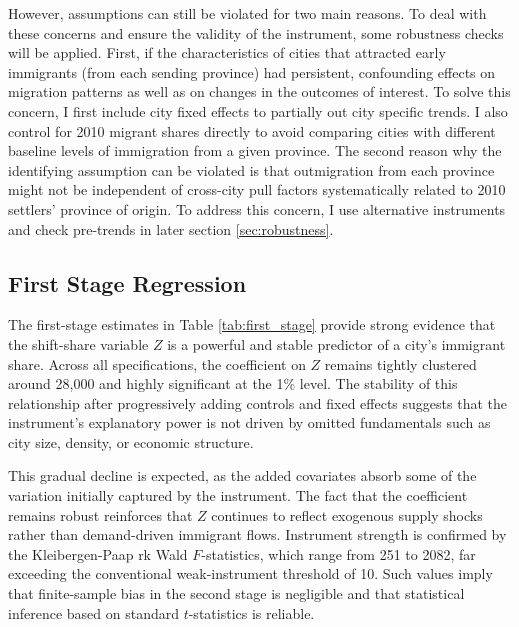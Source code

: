 \documentclass[12pt]{article}
\begin{document}
However, assumptions can still be violated for two main reasons. To deal with these concerns and ensure the validity of the instrument, some robustness checks will be applied.
First, if the characteristics of cities that attracted early immigrants (from each sending province) had persistent, confounding effects on migration patterns as well as on changes in the outcomes of interest. To solve this concern, I first include city fixed effects to partially out city specific trends. I also control for 2010 migrant shares directly to avoid comparing cities with different baseline levels of immigration from a given province.
The second reason why the identifying assumption can be violated is that outmigration from each province might not be independent of cross-city pull factors systematically related to 2010 settlers' province of origin. To address this concern, I use alternative instruments and check pre-trends in later section \ref{sec:robustness}.

\subsection{First Stage Regression}\label{sec:first}

The first-stage estimates in Table \ref{tab:first_stage} provide strong evidence that the shift-share variable $Z$ is a powerful and stable predictor of a city's immigrant share. Across all specifications, the coefficient on $Z$ remains tightly clustered around 28,000 and highly significant at the 1\% level. The stability of this relationship after progressively adding controls and fixed effects suggests that the instrument's explanatory power is not driven by omitted fundamentals such as city size, density, or economic structure.

This gradual decline is expected, as the added covariates absorb some of the variation initially captured by the instrument. The fact that the coefficient remains robust reinforces that $Z$ continues to reflect exogenous supply shocks rather than demand-driven immigrant flows. Instrument strength is confirmed by the Kleibergen-Paap rk Wald $F$-statistics, which range from 251 to 2082, far exceeding the conventional weak-instrument threshold of 10.
Such values imply that finite-sample bias in the second stage is negligible and that statistical inference based on standard $t$-statistics is reliable.
\end{document}

